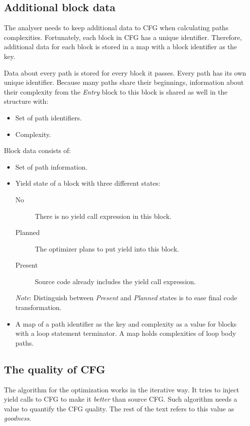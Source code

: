 \subsection{Additional block data}
The analyser needs to keep additional data to CFG when calculating paths complexities. Fortunately, each block in CFG has a unique identifier. Therefore, additional data for each block is stored in a map with a block identifier as the key.

Data about every path is stored for every block it passes. Every path has its own unique identifier. Because many paths share their beginnings, information about their complexity from the \emph{Entry} block to this block is shared as well in the structure with:

\begin{itemize}
\item{Set of path identifiers.}
\item{Complexity.}
\end{itemize}
Block data consists of:
\begin{itemize}
\item{Set of path information.}
\item{Yield state of a block with three different states:}
	\begin{description}
	\item[No]{There is no yield call expression in this block.}
	\item[Planned]{The optimizer plans to put yield into this block.}
	\item[Present]{Source code already includes the yield call expression.}
	\end{description}
	\emph{Note}: Distinguish between \emph{Present} and \emph{Planned} states is to ease final code transformation.
\item{A map of a path identifier as the key and complexity as a value for blocks with a loop statement terminator. A map holds complexities of loop body paths.}
\end{itemize}

\subsection{The quality of CFG}
The algorithm for the optimization works in the iterative way. It tries to inject yield calls to CFG to make it \textit{better} than source CFG. Such algorithm needs a value to quantify the CFG quality. The rest of the text refers to this value as \emph{goodness}.

